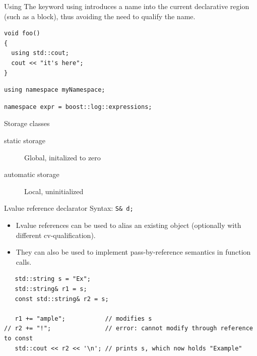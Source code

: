 \documentclass{beamer}
\begin{document}
\begin{frame}[fragile]{Using}
The keyword using introduces a name into the current declarative region (such as
a block), thus avoiding the need to qualify the name.
\begin{lstlisting}[caption=using]
void foo()
{
  using std::cout;
  cout << "it's here";
}
\end{lstlisting}
\begin{lstlisting}[caption=using namespace]
using namespace myNamespace;
\end{lstlisting}

\begin{lstlisting}[caption=namespace alias]
namespace expr = boost::log::expressions;
\end{lstlisting}

\end{frame}

\begin{frame}{Storage classes}
\begin{description}
\item[static storage] Global, initalized to zero
\item[automatic storage] Local, uninitialized
\end{description}
\end{frame}

\begin{frame}[fragile]{Lvalue reference declarator}
Syntax: \lstinline{S& d;}
\begin{itemize}
  \item Lvalue references can be used to alias an existing object (optionally
  with different cv-qualification).
  \item They can also be used to implement pass-by-reference semantics in
  function calls.
\end{itemize}
\begin{lstlisting}
   std::string s = "Ex";
   std::string& r1 = s;
   const std::string& r2 = s;
 
   r1 += "ample";           // modifies s
// r2 += "!";               // error: cannot modify through reference to const
   std::cout << r2 << '\n'; // prints s, which now holds "Example"
\end{lstlisting}
\end{frame}
\end{document}
